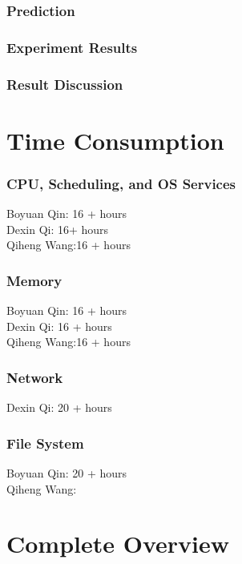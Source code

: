 \documentclass{article} %
\begin{document}
\subsubsection{Prediction}
\subsubsection{Experiment Results}
\subsubsection{Result Discussion}


\section{Time Consumption}
\subsubsection{CPU, Scheduling, and OS Services}
Boyuan Qin: 16 + hours\\
Dexin Qi: 16+ hours\\
Qiheng Wang:16 + hours
\subsubsection{Memory}
Boyuan Qin: 16 + hours\\
Dexin Qi: 16 + hours\\
Qiheng Wang:16 + hours
\subsubsection{Network}
Dexin Qi: 20 + hours 
\subsubsection{File System}
Boyuan Qin: 20 + hours\\
Qiheng Wang: 


\section{Complete Overview}
\end{document}
